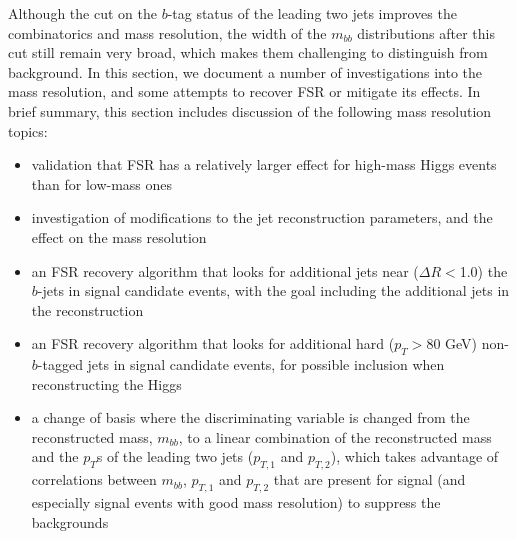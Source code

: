 Although the cut on the $b$-tag status of the leading two jets improves the combinatorics and 
mass resolution, the width of the $m_{bb}$ distributions after this cut still remain very broad, 
which makes them challenging to distinguish from background.  In this section, we document a number
of investigations into the mass resolution, and some attempts to recover FSR or mitigate its effects.
In brief summary, this section includes discussion of the following mass resolution topics: 

\begin{itemize}
    \item validation that FSR has a relatively larger effect for high-mass Higgs events than for low-mass ones
    \item investigation of modifications to the jet reconstruction parameters, and the effect on the mass resolution 
    \item an FSR recovery algorithm that looks for additional jets near ($\Delta R<$1.0) the $b$-jets
    in signal candidate events, with the goal including the additional jets in the reconstruction
    \item an FSR recovery algorithm that looks for additional hard ($p_T>$80 GeV) non-$b$-tagged
    jets in signal candidate events, for possible inclusion when reconstructing the Higgs 
    \item a change of basis where the discriminating variable is changed from the reconstructed mass, $m_{bb}$,
    to a linear combination of the reconstructed mass and the $p_T$s of the leading two jets ($p_{T,1}$
    and $p_{T,2}$), which takes advantage of correlations between $m_{bb}$, $p_{T,1}$ and $p_{T,2}$ 
    that are present for signal (and especially signal events with good mass resolution) to suppress
    the backgrounds
\end{itemize}







